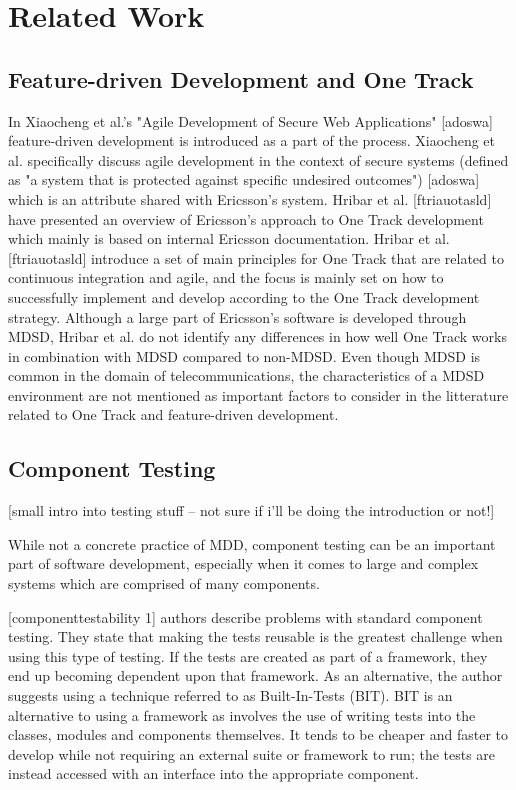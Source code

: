 \documentclass[fina_report_innit.tex]{subfiles}
\begin{document}
\section{Related Work}


\subsection*{Feature-driven Development and One Track}
In Xiaocheng et al.'s "Agile Development of Secure Web Applications" [adoswa] feature-driven development is introduced as a part of the process. Xiaocheng et al. specifically discuss agile development in the context of secure systems (defined as "a system that is protected against specific undesired outcomes") [adoswa] which is an attribute shared with Ericsson's system. Hribar et al. [ftriauotasld] have presented an overview of Ericsson's approach to One Track development which mainly is based on internal Ericsson documentation. Hribar et al. [ftriauotasld] introduce a set of main principles for One Track that are related to continuous integration and agile, and the focus is mainly set on how to successfully implement and develop according to the One Track development strategy. Although a large part of Ericsson's software is developed through MDSD, Hribar et al. do not identify any differences in how well One Track works in combination with MDSD compared to non-MDSD. Even though MDSD is common in the domain of telecommunications, the characteristics of a MDSD environment are not mentioned as important factors to consider in the litterature related to One Track and feature-driven development. 


\subsection*{Component Testing}
[small intro into testing stuff – not sure if i'll be doing the introduction or not!]

While not a concrete practice of MDD, component testing can be an important part of software development, especially when it comes to large and complex systems which are comprised of many components.

[componenttestability 1] authors describe problems with standard component testing. They state that making the tests reusable is the greatest challenge when using this type of testing. If the tests are created as part of a framework, they end up becoming dependent upon that framework. As an alternative, the author suggests using a technique referred to as Built-In-Tests (BIT). BIT is an alternative to using a framework as involves the use of writing tests into the classes, modules and components themselves. It tends to be cheaper and faster to develop while not requiring an external suite or framework to run; the tests are instead accessed with an interface into the appropriate component.
\end{document}
